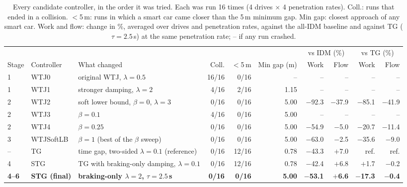 \begin{table}[htbp]
\centering
\footnotesize
\caption{Every candidate controller, in the order it was tried. Each was run 16 times (4 drives $\times$ 4 penetration rates). Coll.: runs that ended in a collision. $<$5\,m: runs in which a smart car came closer than the 5\,m minimum gap. Min gap: closest approach of any smart car. Work and flow: change in \%, averaged over drives and penetration rates, against the all-IDM baseline and against TG ($\tau=2.5$\,s) at the same penetration rate; -- if any run crashed.}
\label{tab:path}
\setlength{\tabcolsep}{4pt}
\begin{tabular}{llp{4.6cm}rrrrrrr}
\toprule
 & & & & & & \multicolumn{2}{c}{vs IDM (\%)} & \multicolumn{2}{c}{vs TG (\%)} \\
\cmidrule(lr){7-8}\cmidrule(lr){9-10}
Stage & Controller & What changed & Coll. & $<$5\,m & Min gap (m) & Work & Flow & Work & Flow \\
\midrule
1 & WTJ0 & original WTJ, $\lambda=0.5$ & 16/16 & 0/16 & -- & -- & -- & -- & -- \\
1 & WTJ1 & stronger damping, $\lambda=2$ & 4/16 & 2/16 & 1.15 & -- & -- & -- & -- \\
2 & WTJ2 & soft lower bound, $\beta=0$, $\lambda=3$ & 0/16 & 0/16 & 5.00 & $-$92.3 & $-$37.9 & $-$85.1 & $-$41.9 \\
2 & WTJ3 & $\beta=0.1$ & 4/16 & 0/16 & 5.00 & -- & -- & -- & -- \\
2 & WTJ4 & $\beta=0.25$ & 0/16 & 0/16 & 5.00 & $-$54.9 & $-$5.0 & $-$20.7 & $-$11.4 \\
3 & WTJSoftLB & $\beta=1$ (best of the $\beta$ sweep) & 0/16 & 0/16 & 5.00 & $-$63.0 & $-$2.5 & $-$35.6 & $-$9.0 \\
-- & TG & time gap, two-sided $\lambda=0.1$ (reference) & 0/16 & 12/16 & 0.78 & $-$43.3 & $+$7.0 & ref. & ref. \\
4 & STG & TG with braking-only damping, $\lambda=0.1$ & 0/16 & 12/16 & 0.78 & $-$42.4 & $+$6.8 & $+$1.7 & $-$0.2 \\
\textbf{4--6} & \textbf{STG (final)} & \textbf{braking-only $\lambda=2$, $\tau=2.5$\,s} & \textbf{0/16} & \textbf{0/16} & \textbf{5.00} & \textbf{$-$53.1} & \textbf{$+$6.6} & \textbf{$-$17.3} & \textbf{$-$0.4} \\
\bottomrule
\end{tabular}
\end{table}
